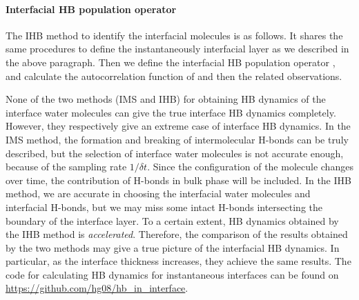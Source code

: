 \paragraph{Interfacial HB population operator \hbos} 
The IHB method to identify the interfacial molecules is as follows. 
It shares the same procedures to define the instantaneously interfacial layer as we described in the above paragraph.
Then we define the interfacial HB population operator \hbos,
and calculate the autocorrelation function of \hbos and then the related observations. 


None of the two methods (IMS and IHB) for obtaining HB dynamics of the interface water molecules 
can give the true interface HB dynamics completely. However, they respectively give an extreme case of interface HB dynamics. 
In the IMS method, the formation and breaking of intermolecular H-bonds can be truly described, 
but the selection of interface water molecules is not accurate enough, because of the sampling rate $1/{\delta t}$. 
Since the configuration of the molecule changes over time, 
the contribution of H-bonds in bulk phase will be included. 
In the IHB method, we are accurate in choosing the interfacial water molecules and interfacial H-bonds, 
but we may miss some intact H-bonds intersecting the boundary of the interface layer. 
To a certain extent, HB dynamics obtained by the IHB method is \emph{accelerated}. 
Therefore, the comparison of the results obtained by the two methods may give a true picture of the interfacial HB dynamics.
In particular, as the interface thickness increases, they achieve the same results.
The code for calculating HB dynamics for instantaneous interfaces can be found on \url{https://github.com/hg08/hb_in_interface}. 

